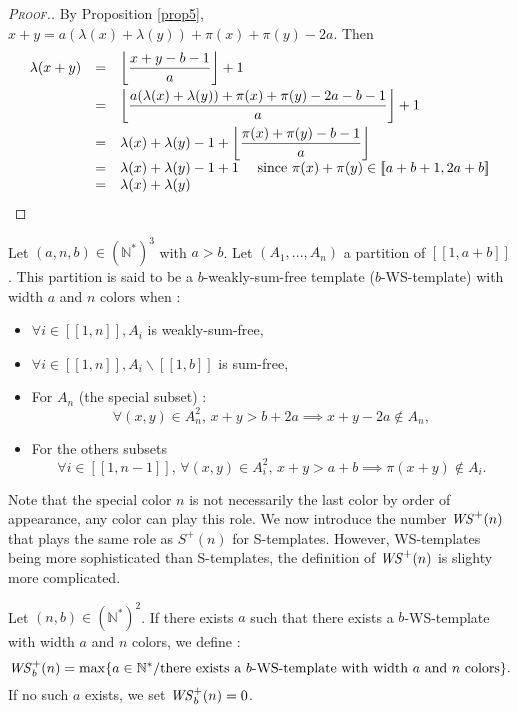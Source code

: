 \begin{proof}[\textsc{Proof.}]
By Proposition \ref{prop5}, \(x + y = a (\lambda(x) + \lambda(y)) + \pi(x) + \pi(y) - 2 a\). Then
\[
\begin{array}{l l l}
	\lambda(x + y) & = & \left \lfloor \dfrac{x + y - b - 1}{a} \right \rfloor + 1 \vspace{1mm} \\
	 & = & \left \lfloor \dfrac{a (\lambda(x) + \lambda(y)) + \pi(x) + \pi(y) - 2 a - b - 1}{a} \right \rfloor + 1 \vspace{1mm} \\
	 & = & \lambda(x) + \lambda(y) - 1 + \left \lfloor \dfrac{\pi(x) + \pi(y) - b - 1}{a}\right\rfloor \\
	 & = & \lambda(x)+\lambda(y) -1 +1 ~~~~\text{since } \pi(x) + \pi(y) \in [\![a + b + 1, 2 a + b]\!] \\
	 & =& \lambda(x)+\lambda(y)
\end{array}
\]
\end{proof}

\begin{definition}
Let \( (a,n,b) \in (\mathbb{N}^*)^3\) with \(a > b\). Let \((A_1,...,A_n)\) a partition of  \([\![1, a + b]\!]\).
This partition is said to be a \(b\)-weakly-sum-free template (\(b\)-WS-template) with width \(a\) and \(n\) colors when :

\begin{itemize}
\item \(\forall i \in [\![1, n]\!], A_i\) is weakly-sum-free,
\item \(\forall i \in [\![1, n]\!], A_i\backslash [\![1, b]\!]\) is sum-free,
\item For \(A_n\) (the special subset) :
	\[
	\forall (x,y) \in A_n^2, \,x+y>b+2a \implies x+y-2a\notin A_n,
	\]
\item For the others subsets
	\[
	\forall i \in [\![1,n-1]\!], \, \forall(x,y) \in A_i^2, \, x+y>a+b \implies \pi(x+y) \notin A_i.
	\]
\end{itemize}
\end{definition}

Note that the special color \(n\) is not necessarily the last color by order of appearance, any color can play this role.
We now introduce the number \(\mathit{WS}^+(n)\) that plays the same role as \(S^+(n)\) for S-templates.
However, WS-templates being more sophisticated than S-templates, the definition of \(\mathit{WS}^+(n)\)
is slighty more complicated.

\begin{definition}
Let \( (n,b) \in (\mathbb{N}^*)^2\). If there exists \(a\) such that there exists a \(b\)-WS-template with width \(a\)
and \(n\) colors, we define :
\[
\mathit{WS}_b^+(n)= \max \{a \in \mathbb{N}^*/ \text{there exists a } b \text{-WS-template with width } a \text{ and } n \text{ colors} \}.
\]
If no such \(a\) exists, we set \(\mathit{WS}_b^+(n) = 0\).
\end{definition}

